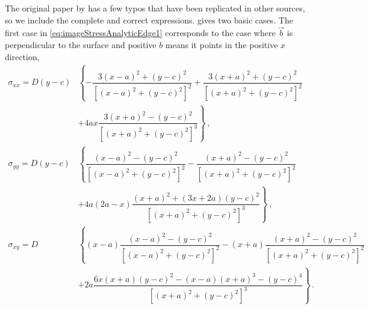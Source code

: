 \documentclass[11pt]{iopart}
\begin{document}
The original paper by \citet{head1953edge} has a few typos that have been replicated in other sources, so we include the complete and correct expressions. \citet{head1953edge} gives two basic cases. The first case in \cref{eq:imageStressAnalyticEdge1} corresponds to the case where $\vec{b}$ is perpendicular to the surface and positive $b$ means it points in the positive $x$ direction,
\begin{subequations}
    \begin{align}\label{eq:imageStressAnalyticEdge1}
        \sigma_{xx} = D (y - c) & \left\{-\dfrac{3 (x - a)^2 + (y - c)^2}{[(x - a)^2 + (y - c)^2]^2} + \dfrac{3 (x + a)^2 + (y - c)^2}{[(x + a)^2 + (y - c)^2]^2}\right.                                             \\\nonumber
                                & \left. + 4 a x \dfrac{3 (x + a)^2 - (y - c)^2}{[(x + a)^2 + (y - c)^2]^3}\right\}\,,                                                                                               \\
        \sigma_{yy} = D (y - c) & \left\{\dfrac{(x - a)^2 - (y - c)^2}{[(x - a)^2 + (y - c)^2]^2} - \dfrac{(x + a)^2 - (y - c)^2}{[(x + a)^2 + (y - c)^2]^2}                                                 \right. \\\nonumber
                                & \left. + 4 a (2 a - x) \dfrac{(x + a)^2 + (3 x + 2 a) (y - c)^2}{[(x + a)^2 + (y - c)^2]^3}\right\}\,,                                                                             \\
        \sigma_{xy} = D         & \left\{(x - a) \dfrac{(x - a)^2 - (y - c)^2}{[(x - a)^2 + (y - c)^2]^2} - (x + a) \dfrac{(x + a)^2 - (y - c)^2}{[(x + a)^2 + (y - c)^2]^2}\right.                                  \\\nonumber
                                & \left. + 2 a \dfrac{6 x (x + a) (y - c)^2 - (x - a) (x + a)^3 - (y - c)^4}{[(x + a)^2 + (y - c)^2]^3}\right\}\,.
    \end{align}
\end{subequations}
\end{document}
